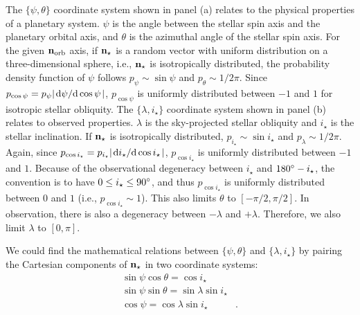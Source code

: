 \documentclass[twocolumn,times]{aastex631}
\begin{document}
The $\{\psi, \theta\}$ coordinate system shown in panel (a) relates to the physical properties of a planetary system. $\psi$ is the angle between the stellar spin axis and the planetary orbital axis, and $\theta$ is the azimuthal angle of the stellar spin axis. For the given $\bf{n}_{\rm orb}$ axis, if $\bf{n}_{\star}$ is a random vector with uniform distribution on a three-dimensional sphere, i.e., $\bf{n}_{\star}$ is isotropically distributed, the probability density function of $\psi$ follows $p_{\psi} \sim \sin{\psi}$ and $p_\theta \sim 1/2\pi$. Since $p_{\cos{\psi}} = p_{\psi} \abs{\dv*{\psi}{\cos{\psi}}}$, $p_{\cos{\psi}}$ is uniformly distributed between $-1$ and $1$ for isotropic stellar obliquity.
The $\{\lambda, i_\star\}$ coordinate system shown in panel (b) relates to observed properties. $\lambda$ is the sky-projected stellar obliquity and $i_\star$ is the stellar inclination. If $\bf{n}_{\star}$ is isotropically distributed, $p_{i_\star} \sim \sin{i_\star}$ and $p_\lambda \sim 1/2\pi$. Again, since $p_{\cos{i_\star}} = p_{i_\star} \abs{\dv*{i_\star}{\cos{i_\star}}}$, $p_{\cos{i_\star}}$ is uniformly distributed between $-1$ and $1$. Because of the observational degeneracy between $i_\star$ and $180\mbox{$^\circ$} - i_\star$, the convention is to have $0 \leq i_\star \leq 90\mbox{$^\circ$}$, and thus $p_{\cos{i_\star}}$ is uniformly distributed between $0$ and $1$ (i.e., $p_{\cos{i_\star}} \sim 1$). This also limits $\theta$ to $[-\pi/2, \pi/2]$. 
In observation, there is also a degeneracy between $-\lambda$ and $+\lambda$. Therefore, we also limit $\lambda$ to $[0,\pi]$.

We could find the mathematical relations between $\{\psi, \theta\}$ and $\{\lambda, i_\star\}$ by pairing the Cartesian components of $\bf{n}_{\star}$ in two coordinate systems:
\begin{align}
    \sin{\psi}\cos{\theta} = \cos{i_\star}& \label{eq:coord1}\\
    \sin{\psi}\sin{\theta} = \sin{\lambda}\sin{i_\star}& \label{eq:coord2}\\
    \cos{\psi} = \cos{\lambda}\sin{i_\star} \label{eq:coord3}&.
\end{align}
\end{document}
